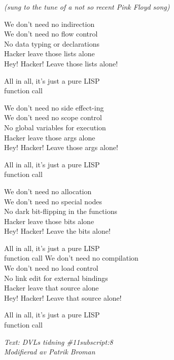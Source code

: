 {\footnotesize\textit{(sung to the tune of a not so recent Pink Floyd song)}}\par
\vspace{10pt}
We don't need no indirection\\
We don't need no flow control\\
No data typing or declarations\\
Hacker leave those lists alone\\
Hey! Hacker! Leave those lists alone!\par
\vspace{10pt}
All in all, it's just a pure LISP\\
function call\par
\vspace{10pt}
We don't need no side effect-ing\\
We don't need no scope control\\
No global variables for execution\\
Hacker leave those args alone\\
Hey! Hacker! Leave those args alone!\par
\vspace{10pt}
All in all, it's just a pure LISP\\
function call\par
\vspace{10pt}
We don't need no allocation\\
We don't need no special nodes\\
No dark bit-flipping in the functions\\
Hacker leave those bits alone\\
Hey! Hacker! Leave the bits alone!\par
\vspace{10pt}
All in all, it's just a pure LISP\\
function call
\newpage
We don't need no compilation\\
We don't need no load control\\
No link edit for external bindings\\
Hacker leave that source alone\\
Hey! Hacker! Leave that source alone!\par
\vspace{10pt}
All in all, it's just a pure LISP\\
function call\par
\vspace{10pt}
{\footnotesize\textit{Text: DVLs tidning \#11subscript:8\\
Modifierad av Patrik Broman}}
